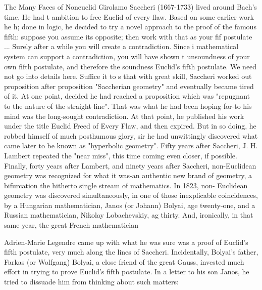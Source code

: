 The Many Faces of Noneuclid Girolamo Saccheri (1667-1733) lived around Bach's time. He had t ambition to free Euclid of every flaw. Based on some earlier work he h; done in logic, he decided to try a novel approach to the proof of the famous fifth: suppose you assume its opposite; then work with that as your fif postulate ... Surely after a while you will create a contradiction. Since i mathematical system can support a contradiction, you will have shown t unsoundness of your own fifth postulate, and therefore the soundness Euclid's fifth postulate. We need not go into details here. Suffice it to s that with great skill, Saccheri worked out proposition after proposition "Saccherian geometry" and eventually became tired of it. At one point, decided he had reached a proposition which was "repugnant to the nature of the straight line". That was what he had been hoping for-to his mind was the long-sought contradiction. At that point, he published his work under the title Euclid Freed of Every Flaw, and then expired. But in so doing, he robbed himself of much posthumous glory, sir he had unwittingly discovered what came later to be known as "hyperbolic geometry". Fifty years after Saccheri, J. H. Lambert repeated the "near miss", this time coming even closer, if possible. Finally, forty years after Lambert, and ninety years after Saccheri, non-Euclidean geometry was recognized for what it was-an authentic new brand of geometry, a bifurcation the hitherto single stream of mathematics. In 1823, non- Euclidean geometry was discovered simultaneously, in one of those inexplicable coincidences, by a Hungarian mathematician, Janos (or Johann) Bolyai, age twenty-one, and a Russian mathematician, Nikolay Lobachevskiy, ag thirty. And, ironically, in that same year, the great French mathematician 







Adrien-Marie Legendre came up with what he was sure was a proof of Euclid's fifth postulate, very much along the lines of Saccheri. Incidentally, Bolyai's father, Farkas (or Wolfgang) Bolyai, a close friend of the great Gauss, invested much effort in trying to prove Euclid's fifth postulate. In a letter to his son Janos, he tried to dissuade him from thinking about such matters: 

